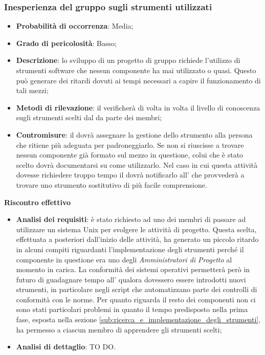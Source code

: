 		\subsubsection{Inesperienza del gruppo sugli strumenti utilizzati} %
		\label{ssub:inesperienza_del_gruppo_sugli_strumenti_utilizzati}
			\begin{itemize}
				\item \textbf{Probabilità di occorrenza}: Media;
				\item \textbf{Grado di pericolosità}: Basso;
				\item \textbf{Descrizione}: lo sviluppo di un progetto di gruppo richiede l'utilizzo di strumenti software che nessun componente ha mai utilizzato o quasi. Questo può generare dei ritardi dovuti ai tempi necessari a capire il funzionamento di tali mezzi;
				\item \textbf{Metodi di rilevazione}: il \roleProjectManager{} verificherà di volta in volta il livello di conoscenza sugli strumenti  scelti dal \roleAdministrator{} da parte dei membri;
				\item \textbf{Contromisure}: il \roleProjectManager{} dovrà assegnare la gestione dello strumento alla persona che ritiene più adeguata per padroneggiarlo. Se non si riuscisse a trovare nessun componente già formato sul mezzo in questione, colui che è stato scelto dovrà documentarsi su come utilizzarlo. Nel caso in cui questa attività dovesse richiedere troppo tempo il \roleProjectManager{} dovrà notificarlo all'\roleAdministrator{} che provvederà a trovare uno strumento sostitutivo di più facile comprensione.
			\end{itemize}
		\noindent
		\textbf{Riscontro effettivo}
			\begin{itemize}
				\item \textbf{Analisi dei requisiti}: è stato richiesto ad uno dei membri di passare ad utilizzare un sistema Unix per svolgere le attività di progetto. Questa scelta, effettuata a posteriori dall'inizio delle attività, ha generato un piccolo ritardo in alcuni compiti riguardanti l'implementazione degli strumenti perché il componente in questione era uno degli \emph{Amministratori di Progetto} al momento in carica. \newline
				La conformità dei sistemi operativi permetterà però in futuro di guadagnare tempo all'\roleAdministrator{} qualora dovessero essere introdotti nuovi strumenti, in particolare negli script che automatizzano parte dei controlli di conformità con le norme. \newline
				Per quanto riguarda il resto dei componenti non ci sono stati particolari problemi in quanto il tempo predisposto nella prima fase, esposta nella sezione \ref{sub:ricerca_e_implementazione_degli_strumenti}, ha permesso a ciascun membro di apprendere gli strumenti scelti;
				\item \textbf{Analisi di dettaglio}: TO DO.
			\end{itemize}


